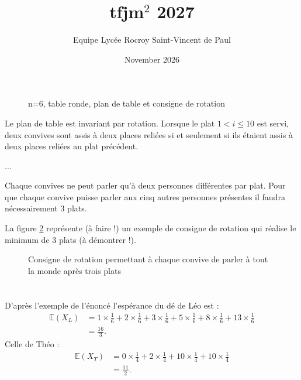 \documentclass[a4paper,12pt]{article}
\title{tfjm$^{2}$ 2027}
\author{Equipe Lycée Rocroy Saint-Vincent de Paul}
\date{November 2026}
\begin{document}
\maketitle

\section{}

\begin{tfjmenum}

\begin{figure}[ht]
\centering

\caption{n=6, table ronde, plan de table et consigne de rotation}
\label{fig1.a}
\end{figure}

    \item[]
    \begin{tfjmenum}
    \item
    Le plan de table est invariant par rotation. Lorsque le plat $1<i\leq 10$ est servi, deux convives sont assis à deux places reliées si et seulement si ils étaient assis à deux places reliées au plat précédent.

    ...

    \item
    Chaque convives ne peut parler qu'à deux personnes différentes par plat. Pour que chaque convive puisse parler aux cinq autres personnes présentes il faudra nécessairement 3 plats.

    La figure \ref{fig1.b} représente (à faire !) un exemple de consigne de rotation qui réalise le minimum de 3 plats (à démontrer !).

    \begin{figure}[ht]
    \centering
    
    \caption{Consigne de rotation permettant à chaque convive de parler à tout la monde après trois plats}
    \label{fig1.b}
    \end{figure}
    
    \end{tfjmenum}
    

\end{tfjmenum}

\section{}

D'après l'exemple de l'énoncé l'espérance du dé de Léo est :
\begin{align*}
    \mathbb{E}(X_L) &= 1\times\frac{1}{6}+2\times\frac{1}{6}+3\times\frac{1}{6}+5\times\frac{1}{6}+8\times\frac{1}{6}+13\times\frac{1}{6} \\
     &= \frac{16}{3}.    
\end{align*}
Celle de Théo :
\begin{align*}
    \mathbb{E}(X_T) &= 0\times\frac{1}{4}+2\times\frac{1}{4}+10\times\frac{1}{4}+10\times\frac{1}{4}\\
     &= \frac{11}{2}.
\end{align*}
\end{document}
